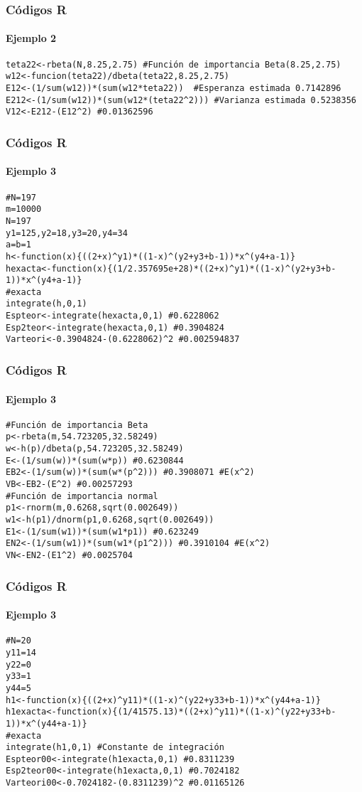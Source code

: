 \documentclass[12pt]{beamer}
\begin{document}
\begin{frame}[fragile]
\frametitle{Códigos R}
\framesubtitle{Ejemplo 2}
\begin{verbatim}
teta22<-rbeta(N,8.25,2.75) #Función de importancia Beta(8.25,2.75)
w12<-funcion(teta22)/dbeta(teta22,8.25,2.75)
E12<-(1/sum(w12))*(sum(w12*teta22))  #Esperanza estimada 0.7142896
E212<-(1/sum(w12))*(sum(w12*(teta22^2))) #Varianza estimada 0.5238356
V12<-E212-(E12^2) #0.01362596
\end{verbatim}
\end{frame}

\begin{frame}[fragile]
\frametitle{Códigos R}
\framesubtitle{Ejemplo 3}
\begin{verbatim}
#N=197
m=10000
N=197
y1=125,y2=18,y3=20,y4=34
a=b=1
h<-function(x){((2+x)^y1)*((1-x)^(y2+y3+b-1))*x^(y4+a-1)}
hexacta<-function(x){(1/2.357695e+28)*((2+x)^y1)*((1-x)^(y2+y3+b-1))*x^(y4+a-1)}
#exacta
integrate(h,0,1)
Espteor<-integrate(hexacta,0,1) #0.6228062
Esp2teor<-integrate(hexacta,0,1) #0.3904824
Varteori<-0.3904824-(0.6228062)^2 #0.002594837

\end{verbatim}
\end{frame}

\begin{frame}[fragile]
\frametitle{Códigos R}
\framesubtitle{Ejemplo 3}
\begin{verbatim}
#Función de importancia Beta
p<-rbeta(m,54.723205,32.58249)
w<-h(p)/dbeta(p,54.723205,32.58249)
E<-(1/sum(w))*(sum(w*p)) #0.6230844
EB2<-(1/sum(w))*(sum(w*(p^2))) #0.3908071 #E(x^2)
VB<-EB2-(E^2) #0.00257293
#Función de importancia normal
p1<-rnorm(m,0.6268,sqrt(0.002649))
w1<-h(p1)/dnorm(p1,0.6268,sqrt(0.002649))
E1<-(1/sum(w1))*(sum(w1*p1)) #0.623249
EN2<-(1/sum(w1))*(sum(w1*(p1^2))) #0.3910104 #E(x^2)
VN<-EN2-(E1^2) #0.0025704
\end{verbatim}
\end{frame}

\begin{frame}[fragile]
\frametitle{Códigos R}
\framesubtitle{Ejemplo 3}
\begin{verbatim}
#N=20
y11=14
y22=0
y33=1
y44=5
h1<-function(x){((2+x)^y11)*((1-x)^(y22+y33+b-1))*x^(y44+a-1)}
h1exacta<-function(x){(1/41575.13)*((2+x)^y11)*((1-x)^(y22+y33+b-1))*x^(y44+a-1)}
#exacta
integrate(h1,0,1) #Constante de integración
Espteor00<-integrate(h1exacta,0,1) #0.8311239 
Esp2teor00<-integrate(h1exacta,0,1) #0.7024182
Varteori00<-0.7024182-(0.8311239)^2 #0.01165126
\end{verbatim}
\end{frame}
\end{document}
